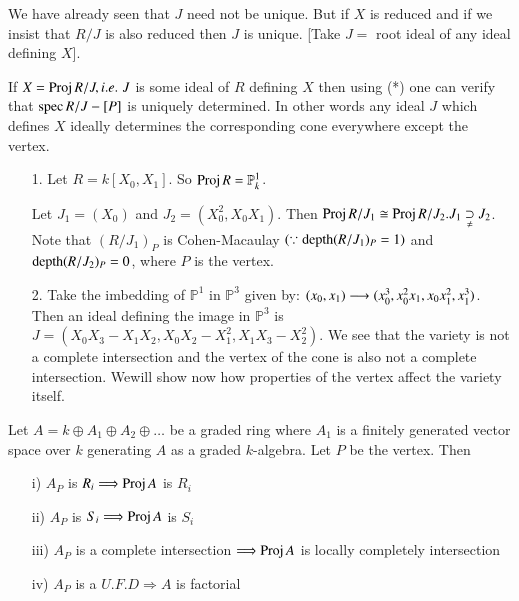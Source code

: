 \begin{REM*}
We have already seen that $J$ need not be unique. But if $X$ is
reduced and if we insist that $R/J$ is also reduced then $J$ is
unique. [Take $J=$ root ideal of any ideal defining $X$].

If $X=\operatorname{Proj} R/J,{i.e.}\kern.3em J$ is some ideal of $R$ defining $X$ then using
(*) one can verify that $\operatorname{spec} R/J-[P]$ is uniquely determined. In
other words any ideal $J$ which defines $X$ ideally determines the
corresponding cone everywhere except the vertex.
\end{REM*}

\begin{examples*}
\begin{itemize}
\item [1.] Let $R=k[X_0, X_1]$. So $\operatorname{Proj} R=\mathbb{P}_k^1$.

Let $J_1=(X_0)$ and $J_2=(X_0^2,X_0X_1)$. Then $\Proj R/J_1\cong\Proj
R/J_2.\break J_1\underset{\neq}{\supset}J_2$. Note that $(R/J_1)_P$ is
Cohen-Macaulay $(\because\operatorname{depth}(R/J_1)_P=1)$ and $\operatorname{depth}(R/J_2)_P=0$,
where $P$ is the vertex.
\item [2.] Take the imbedding of $\mathbb{P}^1$ in $\mathbb{P}^3$
given by: $(x_0,x_1)\longrightarrow
(x_0^3,x_0^2x_1,\break x_0x_1^2,x_1^3)$. Then an ideal defining the image in
$\mathbb{P}^3$ is
$J=(X_0X_3-X_1X_2,X_0X_2-X_1^2,X_1X_3-X_2^2)$. We see that the variety
is not a complete intersection and the vertex of the cone is also not
a complete intersection. We\pageoriginale will show now how properties
of the vertex affect the variety itself.
\end{itemize}
\end{examples*}

\begin{propn}\label{chap1:prop1.1}
Let $A=k\oplus A_1\oplus A_2\oplus\ldots$ be a graded ring where $A_1$
is a finitely generated vector space over $k$ generating $A$ as a
graded $k$-algebra. Let $P$ be the vertex. Then
\begin{itemize}
\item [i)] $A_P$ is $R_i\Longrightarrow\operatorname{Proj} A$ is $R_i$
\item [ii)] $A_P$ is $S_i\Longrightarrow\operatorname{Proj} A$ is $S_i$
\item [iii)] $A_P$ is a complete intersection $\Longrightarrow\operatorname{Proj} A$
  is locally completely intersection
\item [iv)] $A_P$ is a $U.F.D\Longrightarrow A$ is factorial
\end{itemize}
\end{propn}


